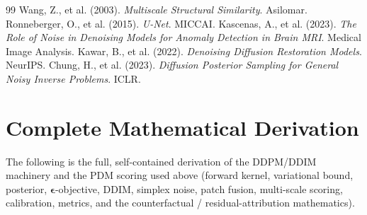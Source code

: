 \documentclass[12pt, a4paper]{article}
\theoremstyle{definition}\newtheorem{definition}{Definition}
\newcommand{\eps}{\bm{\epsilon}}
\begin{document}
\begin{thebibliography}{99}
 Wang, Z., et al. (2003). \textit{Multiscale Structural Similarity}. Asilomar.
 Ronneberger, O., et al. (2015). \textit{U-Net}. MICCAI.
 Kascenas, A., et al. (2023). \textit{The Role of Noise in Denoising Models for Anomaly Detection in Brain MRI}. Medical Image Analysis.
 Kawar, B., et al. (2022). \textit{Denoising Diffusion Restoration Models}. NeurIPS.
 Chung, H., et al. (2023). \textit{Diffusion Posterior Sampling for General Noisy Inverse Problems}. ICLR.
\end{thebibliography}

\appendix
\section{Complete Mathematical Derivation}
\label{app:math}
The following is the full, self-contained derivation of the DDPM/DDIM machinery and
the PDM scoring used above (forward kernel, variational bound, posterior,
$\eps$-objective, DDIM, simplex noise, patch fusion, multi-scale scoring,
calibration, metrics, and the counterfactual / residual-attribution mathematics).
\bigskip

\end{document}

